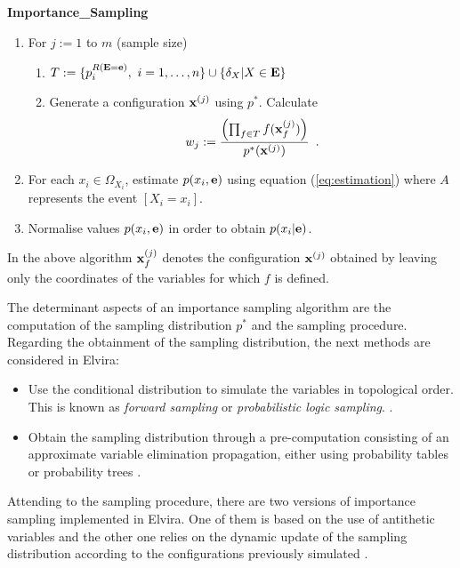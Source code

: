 \bigskip\noindent
\textsf{\textbf{Importance\_Sampling}}

\begin{enumerate}
  
\item For $j:=1$ to $m$ (sample size)
  \begin{enumerate}
  \item $T:=\{ p_i^{R(\mathbf{E}=\mathbf{e})}, ~ i=1,\ldots,n\} \cup \{ \delta_X | X\in\mathbf{E}\}$
  \item Generate a configuration $\mathbf{x}^{(j)}$ using $p^*$.
    Calculate
    \begin{equation}
      w_j:=\frac{\left( \prod_{f\in
            T}f(\mathbf{x}^{(j)}_f)\right)}{p^*(\mathbf{x}^{(j)}) } \enspace .
      \label{peso}
    \end{equation}
  \end{enumerate}
\item For each $x_i \in \Omega_{X_i}$, estimate $p(x_i , \mathbf{e})$
  using equation (\ref{eq:estimation}) where $A$ represents the event
  $[X_i=x_i]$.
\item Normalise values $p(x_i , \mathbf{e})$
  in order to obtain $p(x_i | \mathbf{e})$.
\end{enumerate}

In the above algorithm $\mathbf{x}^{(j)}_f$ denotes the configuration $\mathbf{x}^{(j)}$
obtained by leaving only the coordinates of the variables for which
$f$ is defined.

The determinant aspects of an importance sampling  algorithm are the
computation of the sampling distribution $p^*$ and the sampling
procedure. Regarding the obtainment of the sampling distribution, the
next methods are considered in Elvira:

\begin{itemize}
\item Use the conditional distribution to simulate the variables in
  topological order. This is known as {\em forward sampling} or {\em
    probabilistic logic sampling}.
  \cite{Hen88}.
\item Obtain the sampling distribution through a pre-computation
  consisting of an approximate variable elimination propagation,
  either using probability tables \cite{Her98} or probability trees
  \cite{Sal2000}.
\end{itemize}

Attending to the sampling procedure, there are two versions of
importance sampling implemented in Elvira. One of them is based on the
use of antithetic variables \cite{Sal01} and the other one relies on
the dynamic update of the sampling distribution according to the
configurations previously simulated \cite{Mor03}.